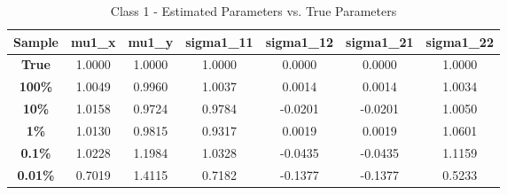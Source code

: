 \documentclass{article}
\begin{document}
\begin{table}[H]
\centering
\small
\caption{Class 1 - Estimated Parameters vs. True Parameters}
\vspace{-0.4em}
\begin{tabular}{ccccccc}
\toprule
\textbf{Sample} & \textbf{mu1\_x} & \textbf{mu1\_y} & \textbf{sigma1\_11} & \textbf{sigma1\_12} & \textbf{sigma1\_21} & \textbf{sigma1\_22} \\
\midrule
\textbf{True} & \cellcolor{trueyellow} 1.0000 & \cellcolor{trueyellow} 1.0000 & \cellcolor{trueyellow} 1.0000 & \cellcolor{trueyellow} 0.0000 & \cellcolor{trueyellow} 0.0000 & \cellcolor{trueyellow} 1.0000 \\
\textbf{100\%} & \cellcolor{meangreen} 1.0049 & \cellcolor{meangreen} 0.9960 & \cellcolor{sigmablue} 1.0037 & \cellcolor{offpurple} 0.0014 & \cellcolor{offpurple} 0.0014 & \cellcolor{sigmablue} 1.0034 \\
\textbf{10\%} & \cellcolor{meangreen} 1.0158 & \cellcolor{meangreen} 0.9724 & \cellcolor{sigmablue} 0.9784 & \cellcolor{offpurple} -0.0201 & \cellcolor{offpurple} -0.0201 & \cellcolor{sigmablue} 1.0050 \\
\textbf{1\%} & \cellcolor{meangreen} 1.0130 & \cellcolor{meangreen} 0.9815 & \cellcolor{sigmablue} 0.9317 & \cellcolor{offpurple} 0.0019 & \cellcolor{offpurple} 0.0019 & \cellcolor{sigmablue} 1.0601 \\
\textbf{0.1\%} & \cellcolor{meangreen} 1.0228 & \cellcolor{meangreen} 1.1984 & \cellcolor{sigmablue} 1.0328 & \cellcolor{offpurple} -0.0435 & \cellcolor{offpurple} -0.0435 & \cellcolor{sigmablue} 1.1159 \\
\textbf{0.01\%} & \cellcolor{meangreen} 0.7019 & \cellcolor{meangreen} 1.4115 & \cellcolor{sigmablue} 0.7182 & \cellcolor{offpurple} -0.1377 & \cellcolor{offpurple} -0.1377 & \cellcolor{sigmablue} 0.5233 \\
\bottomrule
\end{tabular}
\end{table}
\end{document}
